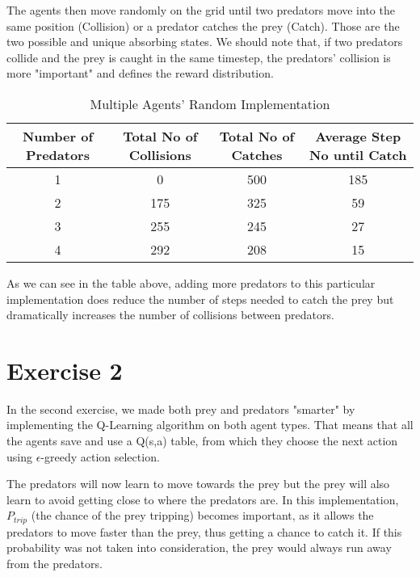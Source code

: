 \documentclass[a4paper,11pt]{article}
\begin{document}
The agents then move randomly on the grid until two predators move into the same position (Collision) or a predator catches the prey (Catch). Those are the two possible and unique absorbing states. We should note that, if two predators collide and the prey is caught in the same timestep, the predators' collision is more "important" and defines the reward distribution.



\begin{table}[h]
\begin{center}
\caption{Multiple Agents' Random Implementation}
\begin{tabular}{c c c c} 
\hline\hline               
Number of Predators & Total No of Collisions & Total No of Catches & Average Step No until Catch \\  
\hline
1 & 0 & 500 & 185\\ 
2 & 175 & 325  & 59\\
3 & 255 & 245   & 27\\
4 & 292 & 208 & 15 \\ 
\end{tabular}
\label{table:multirandom} 
\end{center} 
\end{table} 
\begin{center}

\end{center}

As we can see in the table above, adding more predators to this particular implementation does reduce the number of steps needed to catch the prey but dramatically increases the number of collisions between predators.
 

\section*{Exercise 2}

In the second exercise, we made both prey and predators "smarter" by implementing the Q-Learning algorithm on both agent types. That means that all the agents save and use a Q(s,a) table, from which they choose the next action using $\epsilon$-greedy action selection.

The predators will now learn to move towards the prey but the prey will also learn to avoid getting close to where the predators are. In this implementation, $P_{trip}$ (the chance of the prey tripping) becomes important, as it allows the predators to move faster than the prey, thus getting a chance to catch it. If this probability was not taken into consideration, the prey would always run away from the predators.
\end{document}
